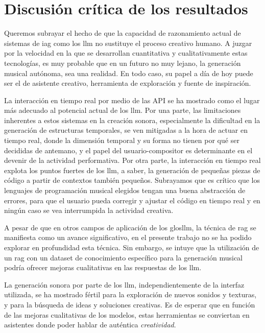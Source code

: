 \begin{enumerate}
\end{enumerate}


\section{Discusión crítica de los resultados}

Queremos subrayar el hecho de que la capacidad de razonamiento actual de sistemas de \gls{iag} como los \gls{llm} no sustituye el proceso creativo humano. A juzgar por la velocidad en la que se desarrollan cuantitativa y cualitativamente estas tecnologías, es muy probable que en un futuro no muy lejano, la generación musical autónoma, sea una realidad. En todo caso, su papel a día de hoy puede ser el de asistente creativo, herramienta de exploración y fuente de inspiración.

La interacción en tiempo real por medio de las API se ha mostrado como el lugar más adecuado al potencial actual de los \gls{llm}. Por una parte, las limitaciones inherentes a estos sistemas en la creación sonora, especialmente la dificultad en la generación de estructuras temporales, se ven mitigadas a la hora de actuar en tiempo real, donde la dimensión temporal y su forma no tienen por qué ser decididas de antemano, y el papel del usuario-compositor es determinante en el devenir de la actividad performativa. Por otra parte, la interacción en tiempo real explota los puntos fuertes de los \gls{llm}, a saber, la generación de pequeñas piezas de código a partir de contextos también pequeños. Subrayamos que es crítico que los lenguajes de programación musical elegidos tengan una buena abstracción de errores, para que el usuario pueda corregir y ajustar el código en tiempo real y en ningún caso se vea interrumpida la actividad creativa.

A pesar de que en otros campos de aplicación de los glos{llm}, la técnica de \gls{rag} se manifiesta como un avance significativo, en el presente trabajo no se ha podido explorar en profundidad esta técnica. Sin embargo, se intuye que la utilización de un \gls{rag} con un dataset de conocimiento específico para la generación musical podría ofrecer mejoras cualitativas en las respuestas de los \gls{llm}.

La generación sonora por parte de los \gls{llm}, independientemente de la interfaz utilizada, se ha mostrado fértil para la exploración de nuevos sonidos y texturas, y para la búsqueda de ideas y soluciones creativas. Es de esperar que en función de las mejoras cualitativas de los modelos, estas herramientas se conviertan en asistentes donde poder hablar de auténtica \emph{creatividad}. 


